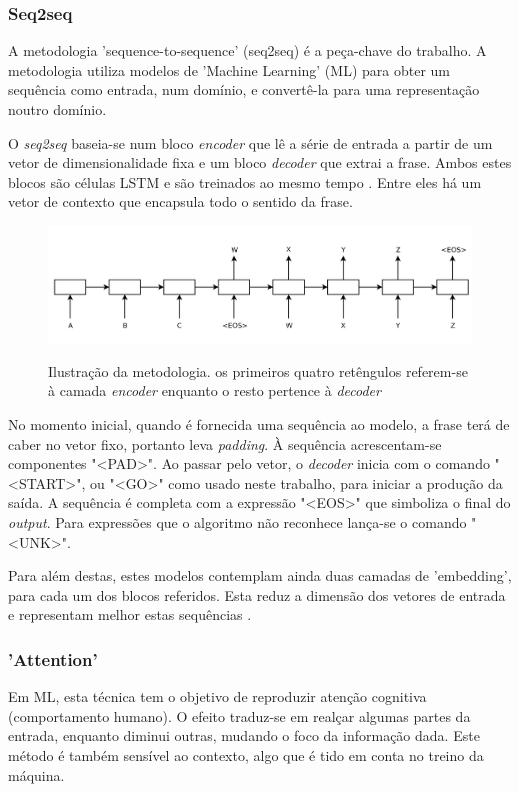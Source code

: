 \documentclass{article}
\begin{document}
\subsubsection{Seq2seq}
A metodologia 'sequence-to-sequence' (seq2seq) é a peça-chave do trabalho. A metodologia utiliza modelos de 'Machine Learning' (ML) para obter um sequência como entrada, num domínio, e convertê-la para uma representação noutro domínio. 

O \textit{seq2seq} baseia-se num bloco \textit{encoder} que lê a série de entrada a partir de um vetor de dimensionalidade fixa e um bloco \textit{decoder} que extrai a frase. Ambos estes blocos são células LSTM e são treinados ao mesmo tempo \cite{sutskever2014sequence}. Entre eles há um vetor de contexto que encapsula todo o sentido da frase.

\begin{figure}[h]
    \centering
    \includegraphics[scale=0.3]{images/encoder_decoder.png}
    \caption{Ilustração da metodologia. os primeiros quatro retêngulos referem-se à camada \textit{encoder} enquanto o resto pertence à \textit{decoder}}
    \cite{sutskever2014sequence}
    \label{fig1}
\end{figure}


No momento inicial, quando é fornecida uma sequência ao modelo, a frase terá de caber no vetor fixo, portanto leva \textit{padding}. À sequência acrescentam-se componentes "\textless PAD\textgreater ". Ao passar pelo vetor, o \textit{decoder} inicia com o comando "\textless START\textgreater ", ou "\textless GO\textgreater " como usado neste trabalho, para iniciar a produção da saída. A sequência é completa com a expressão "\textless EOS\textgreater " que simboliza o final do \textit{output}. Para expressões que o algoritmo não reconhece lança-se o comando "\textless UNK\textgreater ".

Para além destas, estes modelos contemplam ainda duas camadas de 'embedding', para cada um dos blocos referidos. Esta reduz a dimensão dos vetores de entrada e representam melhor estas sequências \cite{li2018slim}. 

\subsubsection{'Attention'}
Em ML, esta técnica tem o objetivo de reproduzir atenção cognitiva (comportamento humano). O efeito traduz-se em realçar algumas partes da entrada, enquanto diminui outras, mudando o foco da informação dada. Este método é também sensível ao contexto, algo que é tido em conta no treino da máquina. 
\end{document}
